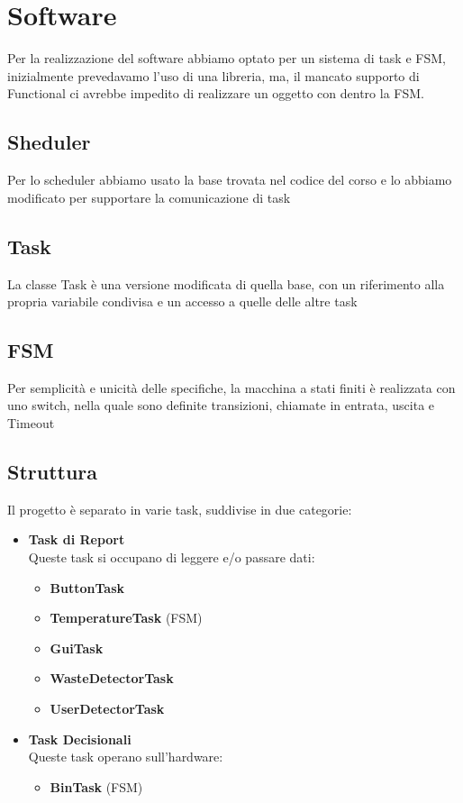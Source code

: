 \documentclass[a4paper,12pt]{report}
\begin{document}
\chapter{Software}
Per la realizzazione del software abbiamo optato per un sistema di task e FSM,
inizialmente prevedavamo l'uso di una libreria, ma, il mancato supporto di Functional
ci avrebbe impedito di realizzare un oggetto con dentro la FSM.
\section{Sheduler}
Per lo scheduler abbiamo usato la base trovata nel codice del corso e lo abbiamo 
modificato per supportare la comunicazione di task
\section{Task}
La classe Task è una versione modificata di quella base, con un riferimento alla propria 
variabile condivisa e un accesso a quelle delle altre task
\section{FSM}
Per semplicità e unicità delle specifiche, la macchina a stati finiti
è realizzata con uno switch, nella quale sono definite transizioni, chiamate in entrata, uscita
e Timeout
\section{Struttura}
Il progetto è separato in varie task, suddivise in due categorie:
\begin{itemize}
    \item \textbf{Task di Report} \\
    Queste task si occupano di leggere e/o passare dati:
    \begin{itemize}
        \item \textbf{ButtonTask}
        \item \textbf{TemperatureTask} (FSM)
        \item \textbf{GuiTask}
        \item \textbf{WasteDetectorTask}
        \item \textbf{UserDetectorTask}
    \end{itemize}
    
    \item \textbf{Task Decisionali} \\
    Queste task operano sull'hardware:
    \begin{itemize}
        \item \textbf{BinTask} (FSM)
    \end{itemize}
\end{itemize}
\end{document}
